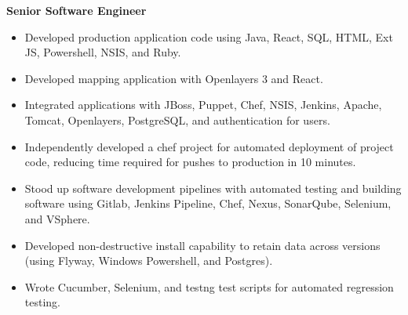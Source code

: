 \documentclass[12pt, line, margin]{res}
\begin{document}
\begin{resume}
                \textbf{Senior Software Engineer} 
                 \begin{itemize}  \itemsep -2pt %
	      \item   Developed production application code using Java, React, SQL, \newline
                                HTML, Ext JS, Powershell, NSIS, and Ruby.
	      \item   Developed mapping application with Openlayers 3 and React.
	      \item   Integrated applications with JBoss, Puppet, Chef, NSIS, Jenkins,
                               Apache, Tomcat, Openlayers, PostgreSQL, and authentication for users.
	      \item   Independently developed a chef project for automated \newline 
                                deployment of project code, reducing time required for\newline
                                pushes to production in 10 minutes.
	      \item   Stood up software development pipelines with automated testing \newline
                               and building software using Gitlab, Jenkins Pipeline, Chef, Nexus,
                               SonarQube, Selenium, and VSphere.
	      \item   Developed non-destructive install capability to retain data across\newline
                               versions (using Flyway, Windows Powershell, and Postgres). 
                \item   Wrote Cucumber, Selenium, and testng test scripts for automated \newline
                               regression testing.
                \end{itemize}
 
\pagebreak


\end{resume}
\end{document}
